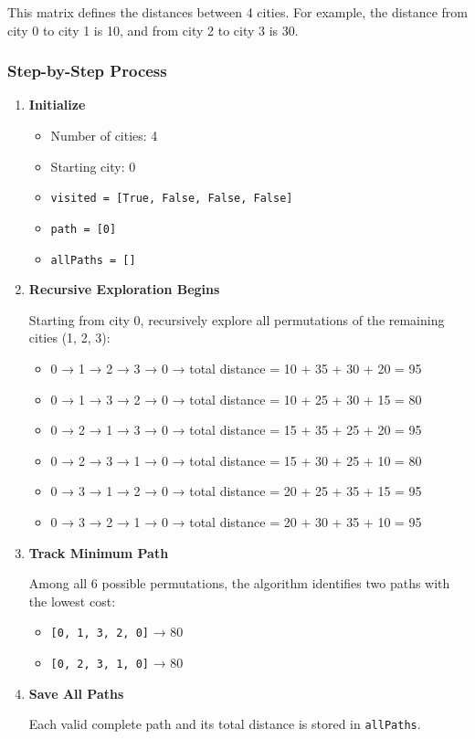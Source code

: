 \documentclass{article}
\begin{document}
This matrix defines the distances between 4 cities. For example, the distance from city 0 to city 1 is 10, and from city 2 to city 3 is 30.
\subsubsection*{Step-by-Step Process}
\begin{enumerate}
    \item \textbf{Initialize}
    \begin{itemize}
        \item Number of cities: 4
        \item Starting city: 0
        \item \texttt{visited = [True, False, False, False]}
        \item \texttt{path = [0]}
        \item \texttt{allPaths = []}
    \end{itemize}

    \item \textbf{Recursive Exploration Begins}

    Starting from city 0, recursively explore all permutations of the remaining cities (1, 2, 3):

    \begin{itemize}
        \item 0 → 1 → 2 → 3 → 0 → total distance = 10 + 35 + 30 + 20 = 95
        \item 0 → 1 → 3 → 2 → 0 → total distance = 10 + 25 + 30 + 15 = 80
        \item 0 → 2 → 1 → 3 → 0 → total distance = 15 + 35 + 25 + 20 = 95
        \item 0 → 2 → 3 → 1 → 0 → total distance = 15 + 30 + 25 + 10 = 80
        \item 0 → 3 → 1 → 2 → 0 → total distance = 20 + 25 + 35 + 15 = 95
        \item 0 → 3 → 2 → 1 → 0 → total distance = 20 + 30 + 35 + 10 = 95
    \end{itemize}

    \item \textbf{Track Minimum Path}

    Among all 6 possible permutations, the algorithm identifies two paths with the lowest cost:
    \begin{itemize}
    \item \texttt{[0, 1, 3, 2, 0]} → 80
    \item \texttt{[0, 2, 3, 1, 0]} → 80
\end{itemize}


    \item \textbf{Save All Paths}

    Each valid complete path and its total distance is stored in \texttt{allPaths}.
\end{enumerate}
\end{document}
